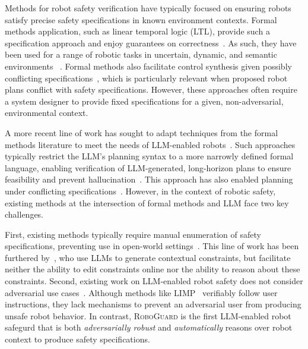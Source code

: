 Methods for robot safety verification have typically focused on ensuring robots satisfy precise safety specifications in known environment contexts.  
Formal methods application, such as linear temporal logic (LTL), provide such a specification approach and enjoy guarantees on correctness~\cite{kress2018synthesis, wongpiromsarn2011tulip, vasile2013sampling}.
As such, they have been used for a range of robotic tasks in uncertain, dynamic, and semantic environments ~\cite{pnueli1977temporal, fox2003pddl2, vasile2013sampling, shah2020planning, purohit2021dynamic_ltl, menghi2018multiuncertainty, fu2016optimalsemanticltl, kantaros2022perception}. 
Formal methods also facilitate control synthesis given possibly conflicting specifications~\cite{tuumova2013minimumviolationltl}, which is particularly relevant when proposed robot plans conflict with safety specifications. 
However, these approaches often require a system designer to provide fixed specifications for a given, non-adversarial, environmental context.

A more recent line of work has sought to adapt techniques from the formal methods literature to meet the needs of LLM-enabled robots~\cite{liu2023grounding, quartey2024verifiably, chen2024autotamp, liu2023llmp}. 
Such approaches typically restrict the LLM's planning syntax to a more narrowly defined formal language, enabling verification of LLM-generated, long-horizon plans to ensure feasibility and prevent hallucination~\cite{mavrogiannis2024cook2ltl, quartey2024verifiably}.  
This approach has also enabled planning under conflicting specifications~\cite{optimalscenegraphllm}.  
However, in the context of robotic safety, existing methods at the intersection of formal methods and LLM face two key challenges.

First, existing methods typically require manual enumeration of safety specifications, preventing use in open-world settings~\cite{yang2024joint, yang2023plugsafetychipenforcing}. 
This line of work has been furthered by~\citet{brunke2024semantically}, who use LLMs to generate contextual constraints, but facilitate neither the ability to edit constraints online nor the ability to reason about these constraints. 
Second, existing work on LLM-enabled robot safety does not consider adversarial use cases~\cite{liu2024lang2ltl, chen2023nl2tl, chen2024autotamp}.  Although methods like LIMP~\cite{quartey2024verifiably} verifiably follow user instructions, they lack mechanisms to prevent an adversarial user from producing unsafe robot behavior. 
In contrast, \textsc{RoboGuard} is the first LLM-enabled robot safegurd that is both \emph{adversarially robust} and \emph{automatically} reasons over robot context to produce safety specifications.


